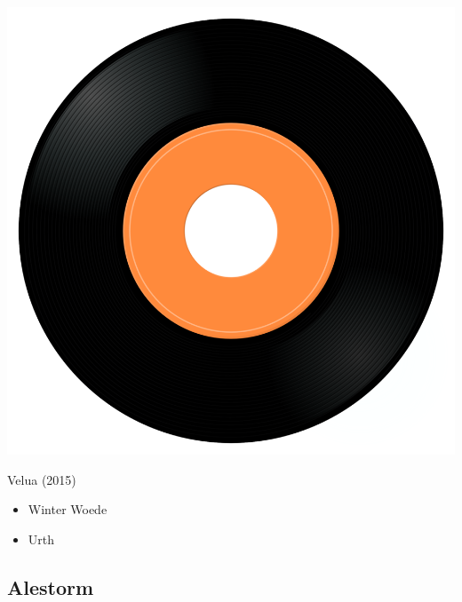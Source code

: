 \begin{minipage}[t]{0.25\textwidth}
\captionsetup{type=figure}
\includegraphics[width=\textwidth]{Images/cover.png}
\caption*{Velua (2015)}
\end{minipage}
\begin{minipage}[t]{0.25\textwidth}\vspace{0pt}
\begin{itemize}[nosep,leftmargin=1em,labelwidth=*,align=left]
	\setlength{\itemsep}{0pt}
	\item Winter Woede
	\item Urth
\end{itemize}
\end{minipage}

\subsection{Alestorm}


